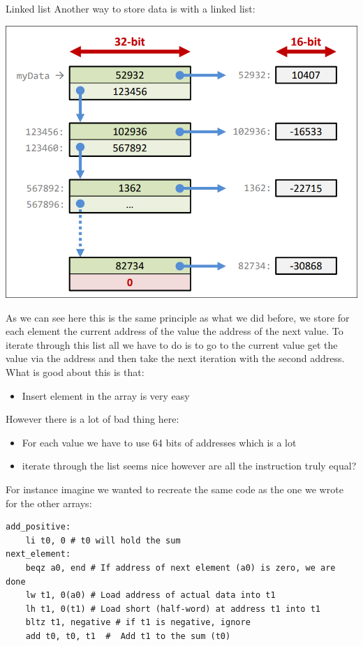 \begin{parag}{Linked list}
    Another way to store data is with a linked list:
	\begin{center}
	\includegraphics[scale=0.3]{screenshots/2025-10-21_1.png}
	\end{center}
	As we can see here this is the same principle as what we did before, we store for each element the current address of the value  the address of the next value. To  iterate through this list all we have to do is to go to the current value get the value via the address and then take the next iteration with the second address.\\
	What is good about this is that:
	\begin{itemize}
	    \item  Insert element in the array is very easy
	\end{itemize}
	However there is a lot of bad thing here:
	\begin{itemize}
	    \item For each value we have to use 64 bits of addresses which is a lot 
		\item iterate through the list seems nice however are all the instruction truly equal?	
	\end{itemize}
	For  instance imagine we wanted to recreate the same code as the one we wrote for the other arrays:
	\begin{lstlisting}[language={[RISC-V]Assembler}]
add_positive:
	li t0, 0 # t0 will hold the sum
next_element:
	beqz a0, end # If address of next element (a0) is zero, we are done
	lw t1, 0(a0) # Load address of actual data into t1
	lh t1, 0(t1) # Load short (half-word) at address t1 into t1
	bltz t1, negative # if t1 is negative, ignore 
	add t0, t0, t1  #  Add t1 to the sum (t0)


\end{lstlisting}
\end{parag}

